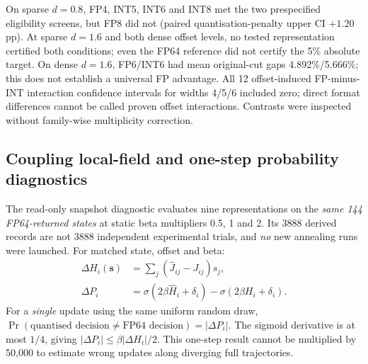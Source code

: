 On sparse $d=0.8$, FP4, INT5, INT6 and INT8 met the two
prespecified eligibility screens, but FP8 did not (paired
quantisation-penalty upper CI $+1.20$ pp). At sparse $d=1.6$
and both dense offset levels, no tested representation certified
both conditions; even the FP64 reference did not certify the 5\%
absolute target. On dense $d=1.6$, FP6/INT6 had mean original-cut
gaps 4.892\%/5.666\%; this does not establish a universal FP
advantage. All 12 offset-induced FP-minus-INT interaction confidence
intervals for widths 4/5/6 included zero; direct format differences
cannot be called proven offset interactions. Contrasts were
inspected without family-wise multiplicity correction.

\subsection{Coupling local-field and one-step probability diagnostics}
The read-only snapshot diagnostic evaluates nine representations on
the \emph{same 144 FP64-returned states} at static beta multipliers
0.5, 1 and 2. Its 3888 derived records are not 3888 independent
experimental trials, and \emph{no} new annealing runs were launched.
For matched state, offset and beta:
\begin{align}
\Delta H_i(\mathbf s)&=\sum_j(\widehat J_{ij}-J_{ij})s_j,\\
\Delta P_i&=\sigma(2\beta\widehat H_i+\delta_i)
             -\sigma(2\beta H_i+\delta_i).
\end{align}
For a \emph{single} update using the same uniform random draw,
$\Pr(\text{quantised decision}\ne\text{FP64 decision})=|\Delta P_i|$.
The sigmoid derivative is at most $1/4$, giving
$|\Delta P_i|\le\beta|\Delta H_i|/2$. This one-step result
cannot be multiplied by 50,000 to estimate wrong updates along
diverging full trajectories.

